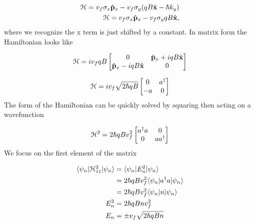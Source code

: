 \begin{align}
  \ham = v_f \sigma_x \op{p}_x - v_f \sigma_y (qB\op{x} - \hbar k_y) \nonumber \\
  \ham = v_f \sigma_x \op{p}_x - v_f \sigma_y qB\op{x},
\end{align}
where we recognize the x term is just shifted by a constant.
In matrix form the Hamiltonian looks like

\[
  \ham = i v_f q B
  \begin{bmatrix}
    0 & \op{p}_x + iqB\op{x} \\
    \op{p}_x - iqB\op{x} & 0
  \end{bmatrix}
\]

\[
  \mathcal{H} = i v_f \sqrt{2\hbar qB}
  \begin{bmatrix}
    0 & a^{\dagger}\\
    -a & 0
  \end{bmatrix}
\]
The form of the Hamiltonian can be quickly solved by squaring then acting on a wavefunction

\[
  \mathcal{H}^2 = 2\hbar qB  v_f^2
  \begin{bmatrix}
    a^{\dagger} a & 0 \\
    0 & aa^{\dagger}
  \end{bmatrix}
\]
We focus on the first element of the matrix

\begin{align}
  \langle \psi_n | \mathcal{H}_{11}^2 |\psi_n\rangle &= \langle \psi_n | E_n^2 |\psi_n\rangle \nonumber \\
    &= 2 \hbar qB v_f^2 \langle \psi_n | a^{\dagger} a |\psi_n\rangle \nonumber \\
    &= 2 \hbar qB v_f^2 \langle \psi_n | n |\psi_n\rangle \nonumber \\
    E_n^2 &= 2 \hbar qB n v_f^2 \nonumber \\
    E_n &= \pm v_f \sqrt{2\hbar qB n}
\end{align}

